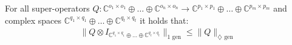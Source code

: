   \begin{theorem} \label{theorem:tensor_stability} 
For all super-operators $Q: \mathbb{C}^{o_1 \times o_1} \oplus \ldots \oplus \mathbb{C}^{o_n \times o_n}  \rightarrow \mathbb{C}^{p_1 \times p_1} \oplus \ldots \oplus  \mathbb{C}^{p_m \times p_m}$ and complex spaces $\mathbb{C}^{q_1 \times q_1} \oplus \ldots \oplus \mathbb{C}^{q_t \times q_t}$  it holds that:
    \begin{equation}
      \begin{split}
        \lVert Q \otimes I_{\mathbb{C}^{q_1 \times q_1} \oplus \ldots \oplus \mathbb{C}^{q_t \times q_t}} \rVert_{1 \text{ gen}} \leq  \lVert Q \rVert_{\diamondsuit \text{ gen}}
      \end{split}
    \end{equation}
    \end{theorem}

